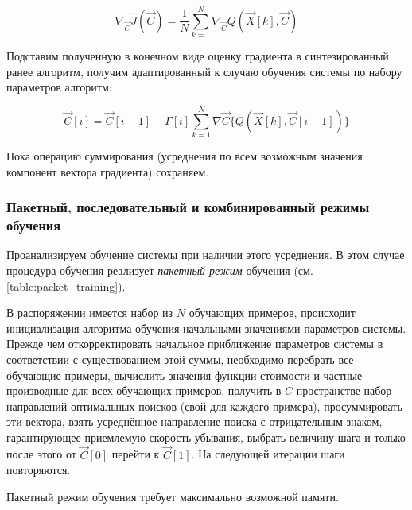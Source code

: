\documentclass{article}
\numberwithin{equation}{subsection}
\begin{document}
\begin{equation}
    \nabla_{\vec{C}} {\hat{J}(\vec{C})} = \dfrac{1}{N} \sum_{k=1}^{N} \nabla_{\vec{C}}{Q(\vec{X}[k], \vec{C})}
\end{equation}

Подставим полученную в конечном виде оценку градиента в синтезированный ранее алгоритм,
получим адаптированный к случаю обучения системы по набору параметров алгоритм:

\begin{equation}
    \vec{C}[i] = \vec{C}[i-1] - \Gamma[i] \sum_{k=1}^{N} \nabla\vec{C} \{ Q(\vec{X}[k], \vec{C}[i-1]) \}
\end{equation}

Пока операцию суммирования (усреднения по всем возможным значения компонент вектора 
градиента) сохраняем.




\subsubsection{Пакетный, последовательный и комбинированный режимы обучения}

Проанализируем обучение системы при наличии этого усреднения. В этом случае процедура 
обучения реализует \textit{пакетный режим} обучения (см. \ref{table:packet_training}).

В распоряжении имеется набор из $N$ обучающих примеров, происходит инициализация алгоритма
обучения начальными значениями параметров системы. Прежде чем откорректировать начальное
приближение параметров системы в соответствии с существованием этой суммы, необходимо
перебрать все обучающие примеры, вычислить значения функции стоимости и частные 
производные для всех обучающих примеров, получить в $C$-пространстве набор направлений
оптимальных поисков (свой для каждого примера), просуммировать эти вектора, взять 
усреднённое направление поиска с отрицательным знаком, гарантирующее приемлемую скорость
убывания, выбрать величину шага и только после этого от $\vec{C}[0]$ перейти к $\vec{C}[1]$.
На следующей итерации шаги повторяются.

Пакетный режим обучения требует максимально возможной памяти.
\end{document}
